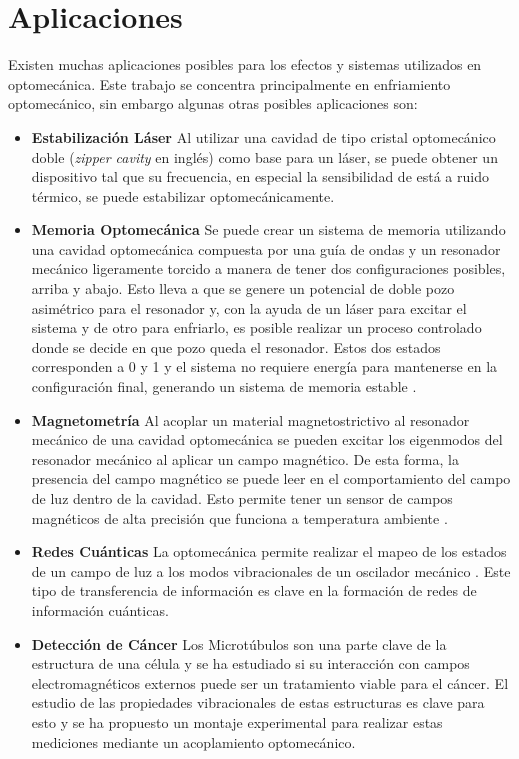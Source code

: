 \documentclass[10pt,a4paper]{report}
\begin{document}
\section{Aplicaciones}

Existen muchas aplicaciones posibles para los efectos y sistemas utilizados en optomecánica. Este trabajo se concentra principalmente en enfriamiento optomecánico, sin embargo algunas otras posibles aplicaciones son:

\begin{itemize}

\item \textbf{Estabilización Láser} Al utilizar una cavidad de tipo cristal optomecánico doble (\textit{zipper cavity} en inglés) como base para un láser, se puede obtener un dispositivo tal que su frecuencia, en especial la sensibilidad de está a ruido térmico, se puede estabilizar optomecánicamente\cite{MayerZC}.

\item  \textbf{Memoria Optomecánica} Se puede crear un sistema de memoria utilizando una cavidad optomecánica compuesta por una guía de ondas y un resonador mecánico ligeramente torcido a manera de tener dos configuraciones posibles, arriba y abajo. Esto lleva a que se genere un potencial de doble pozo asimétrico para el resonador y, con la ayuda de un láser para excitar el sistema y de otro para enfriarlo, es posible realizar un proceso controlado donde se decide en que pozo queda el resonador. Estos dos estados corresponden a 0 y 1 y el sistema no requiere energía para mantenerse en la configuración final, generando un sistema de memoria estable \cite{BagheriMM}.

\item \textbf{Magnetometría} Al acoplar un material magnetostrictivo al resonador mecánico de una cavidad optomecánica se pueden excitar los eigenmodos del resonador mecánico al aplicar un campo magnético. De esta forma, la presencia del campo magnético se puede leer en el comportamiento del campo de luz dentro de la cavidad. Esto permite tener un sensor de campos magnéticos de alta precisión que funciona a temperatura ambiente \cite{ForstnerOM}.

\item \textbf{Redes Cuánticas} La optomecánica permite realizar el mapeo de los estados de un campo de luz a los modos vibracionales de un oscilador mecánico \cite{ZhangQST}. Este tipo de transferencia de información es clave en la formación de redes de información cuánticas.\cite{KimbleQI}

\item \textbf{Detección de Cáncer} Los Microtúbulos son una parte clave de la estructura de una célula y se ha estudiado si su interacción con campos electromagnéticos externos puede ser un tratamiento viable para el cáncer\cite{KirsonEMT}. El estudio de las propiedades vibracionales de estas estructuras es clave para esto y se ha propuesto un montaje experimental para realizar estas mediciones mediante un acoplamiento optomecánico\cite{SalariOC}.

\end{itemize} 
\end{document}
